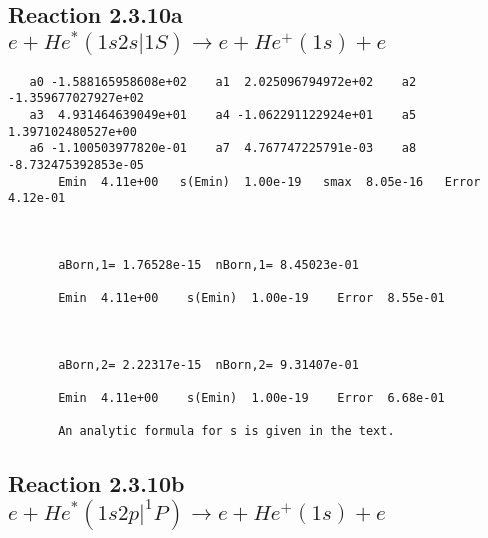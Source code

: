 \documentclass[12pt]{article}
\begin{document}
\newpage
\subsection{
Reaction 2.3.10a $ e + He^*(1s2s|1S) \rightarrow e + He^+(1s) + e$}





\begin{small}\begin{verbatim}
   a0 -1.588165958608e+02    a1  2.025096794972e+02    a2 -1.359677027927e+02
   a3  4.931464639049e+01    a4 -1.062291122924e+01    a5  1.397102480527e+00
   a6 -1.100503977820e-01    a7  4.767747225791e-03    a8 -8.732475392853e-05
       Emin  4.11e+00   s(Emin)  1.00e-19   smax  8.05e-16   Error  4.12e-01



       aBorn,1= 1.76528e-15  nBorn,1= 8.45023e-01

       Emin  4.11e+00    s(Emin)  1.00e-19    Error  8.55e-01



       aBorn,2= 2.22317e-15  nBorn,2= 9.31407e-01

       Emin  4.11e+00    s(Emin)  1.00e-19    Error  6.68e-01

       An analytic formula for s is given in the text.
\end{verbatim}\end{small}







\newpage
\subsection{
Reaction 2.3.10b $e + He^*(1s2p|^1P) \rightarrow e + He^+(1s) + e$}






\end{document}
